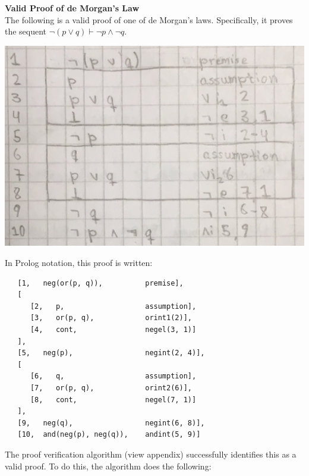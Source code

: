 \documentclass[a4paper, 11pt]{article}
\begin{document}
   \textbf{Valid Proof of de Morgan's Law} \\
   The following is a valid proof of one of de Morgan's laws.
   Specifically, it proves the sequent 
   $\neg(p \vee q) \vdash \neg p \wedge \neg q$.
   \bigbreak

   \includegraphics[scale=0.25]{de-morgan-valid}
   
   In Prolog notation, this proof is written:

   \begin{verbatim}
   [1,   neg(or(p, q)),          premise],
   [
      [2,   p,                   assumption],
      [3,   or(p, q),            orint1(2)],
      [4,   cont,                negel(3, 1)]
   ],
   [5,   neg(p),                 negint(2, 4)],
   [
      [6,   q,                   assumption],
      [7,   or(p, q),            orint2(6)],
      [8,   cont,                negel(7, 1)]
   ],
   [9,   neg(q),                 negint(6, 8)],
   [10,  and(neg(p), neg(q)),    andint(5, 9)]
   \end{verbatim}

   The proof verification algorithm (view appendix)
   successfully identifies this as a valid proof. To do this,
   the algorithm does the following:
\end{document}

